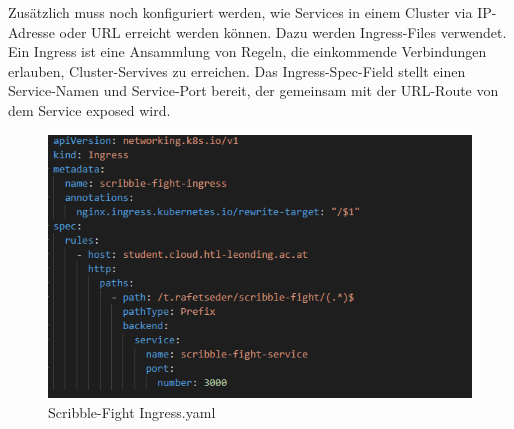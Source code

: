 Zusätzlich muss noch konfiguriert werden, wie Services in einem Cluster via IP-Adresse oder URL erreicht werden können.
Dazu werden Ingress-Files verwendet. Ein Ingress ist eine Ansammlung von Regeln, die einkommende Verbindungen erlauben, Cluster-Servives zu erreichen. 
Das Ingress-Spec-Field stellt einen Service-Namen und Service-Port bereit, der gemeinsam mit der URL-Route von dem Service exposed wird. 

\begin{figure}[H]
    \centering
    \includegraphics[scale=0.85]{pics/ingress.PNG}
    \caption{Scribble-Fight Ingress.yaml}
\end{figure}










